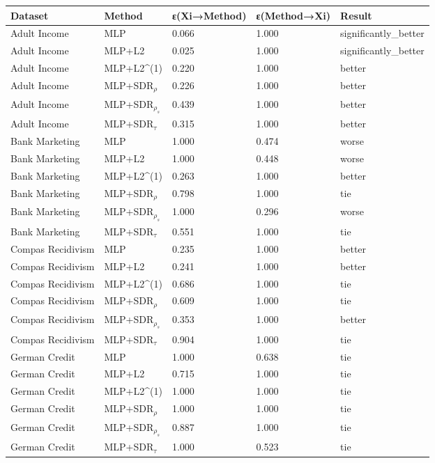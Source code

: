 \begin{tabular}{lllll}
\toprule
Dataset & Method & ε(Xi→Method) & ε(Method→Xi) & Result \\
\midrule
Adult Income & MLP & 0.066 & 1.000 & significantly_better \\
Adult Income & MLP+L2 & 0.025 & 1.000 & significantly_better \\
Adult Income & MLP+L2^{(1)} & 0.220 & 1.000 & better \\
Adult Income & MLP+SDR$_{\rho}$ & 0.226 & 1.000 & better \\
Adult Income & MLP+SDR$_{\rho_s}$ & 0.439 & 1.000 & better \\
Adult Income & MLP+SDR$_{\tau}$ & 0.315 & 1.000 & better \\
Bank Marketing & MLP & 1.000 & 0.474 & worse \\
Bank Marketing & MLP+L2 & 1.000 & 0.448 & worse \\
Bank Marketing & MLP+L2^{(1)} & 0.263 & 1.000 & better \\
Bank Marketing & MLP+SDR$_{\rho}$ & 0.798 & 1.000 & tie \\
Bank Marketing & MLP+SDR$_{\rho_s}$ & 1.000 & 0.296 & worse \\
Bank Marketing & MLP+SDR$_{\tau}$ & 0.551 & 1.000 & tie \\
Compas Recidivism & MLP & 0.235 & 1.000 & better \\
Compas Recidivism & MLP+L2 & 0.241 & 1.000 & better \\
Compas Recidivism & MLP+L2^{(1)} & 0.686 & 1.000 & tie \\
Compas Recidivism & MLP+SDR$_{\rho}$ & 0.609 & 1.000 & tie \\
Compas Recidivism & MLP+SDR$_{\rho_s}$ & 0.353 & 1.000 & better \\
Compas Recidivism & MLP+SDR$_{\tau}$ & 0.904 & 1.000 & tie \\
German Credit & MLP & 1.000 & 0.638 & tie \\
German Credit & MLP+L2 & 0.715 & 1.000 & tie \\
German Credit & MLP+L2^{(1)} & 1.000 & 1.000 & tie \\
German Credit & MLP+SDR$_{\rho}$ & 1.000 & 1.000 & tie \\
German Credit & MLP+SDR$_{\rho_s}$ & 0.887 & 1.000 & tie \\
German Credit & MLP+SDR$_{\tau}$ & 1.000 & 0.523 & tie \\
\bottomrule
\end{tabular}
